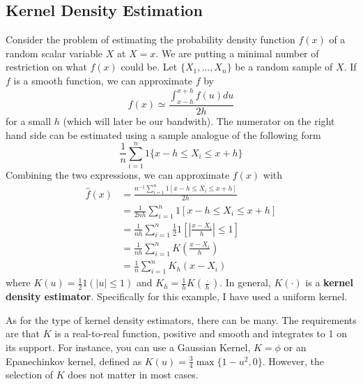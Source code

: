 \documentclass[12pt]{article}
\theoremstyle{definition}
\theoremstyle{property}
\theoremstyle{assumption}
\theoremstyle{example}
\theoremstyle{comment}
\begin{document}
\subsection{Kernel Density Estimation}
Consider the problem of estimating the probability density function $f(x)$ of a random scalar variable $X$ at $X=x$. We are putting a minimal number of restriction on what $f(x)$ could be. Let $\{X_1,...,X_n\}$ be a random sample of $X$. If $f$ is a smooth function, we can approximate $f$ by
\[
f(x)\simeq \frac{\int_{x-h}^{x+h}f(u)du}{2h}
\]
for a small $h$ (which will later be our bandwith). The numerator on the right hand side can be estimated using a sample analogue of the following form
\[
\frac{1}{n}\sum_{i=1}^n 1\{x-h\leq X_i \leq x+h \}
\]
Combining the two expressions, we can approximate $f(x)$ with
\footnotesize{\begin{align*}
\hat{f}(x)&=\frac{n^{-1}\sum_{i=1}^n 1[x-h\leq X_i \leq x+h]}{2h} \\
&=\frac{1}{2nh}\sum_{i=1}^n 1[x-h\leq X_i \leq x+h]\\
&=\frac{1}{nh}\sum_{i=1}^n \frac{1}{2}1\left[\left|\frac{x-X_i}{h}\right| \leq 1\right]\\
&=\frac{1}{nh}\sum_{i=1}^n K\left(\frac{x-X_i}{h}\right)\\
&=\frac{1}{n}\sum_{i=1}^n K_h(x-X_i)
\end{align*}}\normalsize
where $K(u)=\frac{1}{2}1(|u|\leq 1)$ and $K_h = \frac{1}{h}K\left(\frac{\cdot}{h}\right)$. In general, $K(\cdot)$ is a \textbf{kernel density estimator}. Specifically for this example, I have used a uniform kernel. \par
As for the type of kernel density estimators, there can be many. The requirements are that $K$ is a real-to-real function, positive and smooth and integrates to 1 on its support. For instance, you can use a Gaussian Kernel, $K=\phi$ or an Epanechinkov kernel, defined as $K(u)=\frac{3}{4}\max\{1-u^2,0\}$. However, the selection of $K$ does not matter in most cases. 
\end{document}
